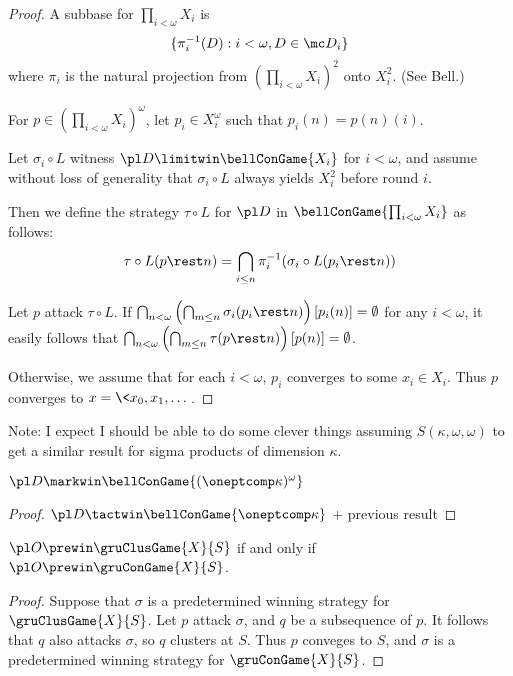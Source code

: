 \begin{proof}
  A subbase for $\prod_{i<\omega}X_i$ is
    \[
      \{\pi_i^{-1}(D):i<\omega, D\in\mc D_i\}
    \]
  where $\pi_i$ is the natural projection from
  $\left(\prod_{i<\omega}X_i\right)^2$ onto $X_i^2$. (See Bell.)

  For $p\in \left(\prod_{i<\omega}X_i\right)^\omega$, let $p_i\in X_i^\omega$
  such that $p_i(n)=p(n)(i)$.

  Let $\sigma_i\circ L$ witness $\pl D\limitwin \bellConGame{X_i}$ for
  $i<\omega$, and assume without loss of generality that
  $\sigma_i\circ L$ always yields $X_i^2$ before round $i$.

  Then we define the strategy $\tau\circ L$ for $\pl D$ in
  $\bellConGame{\prod_{i<\omega}X_i}$ as follows:
    \[
      \tau\circ L(p\rest n)
        =
      \bigcap_{i\leq n} \pi_i^{-1}(\sigma_i\circ L(p_i\rest n))
    \]

  Let $p$ attack $\tau\circ L$. If
    $
      \bigcap_{n<\omega}
      \left(\bigcap_{m\leq n}\sigma_i(p_i\rest n)\right)[p_i(n)]
      = \emptyset
    $
  for any $i<\omega$, it easily follows that
    $
      \bigcap_{n<\omega}
      \left(\bigcap_{m\leq n}\tau(p\rest n)\right)[p(n)]
      = \emptyset
    $.

  Otherwise, we assume that for each $i<\omega$, $p_i$ converges to some
  $x_i\in X_i$. Thus $p$ converges to $x=\<x_0,x_1,\dots\>$.
\end{proof}

Note: I expect I should be able to do some clever things
assuming $S(\kappa,\omega,\omega)$ to get a similar result for sigma
products of dimension $\kappa$.

\begin{ex}
  $\pl D \markwin \bellConGame{(\oneptcomp\kappa)^\omega}$
\end{ex}

\begin{proof}
  $\pl D \tactwin \bellConGame{\oneptcomp\kappa}$ + previous result
\end{proof}




\newpage

\begin{lem}
  $\pl O\prewin\gruClusGame{X}{S}$ if and only if $\pl O\prewin\gruConGame{X}{S}$.
\end{lem}

\begin{proof}
  Suppose that $\sigma$ is a predetermined winning strategy for
  $\gruClusGame{X}{S}$. Let $p$ attack $\sigma$, and $q$ be a subsequence of $p$.
  It follows that $q$ also attacks $\sigma$, so $q$ clusters at $S$. Thus $p$
  conveges to $S$, and $\sigma$ is a predetermined winning strategy for
  $\gruConGame{X}{S}$.
\end{proof}

